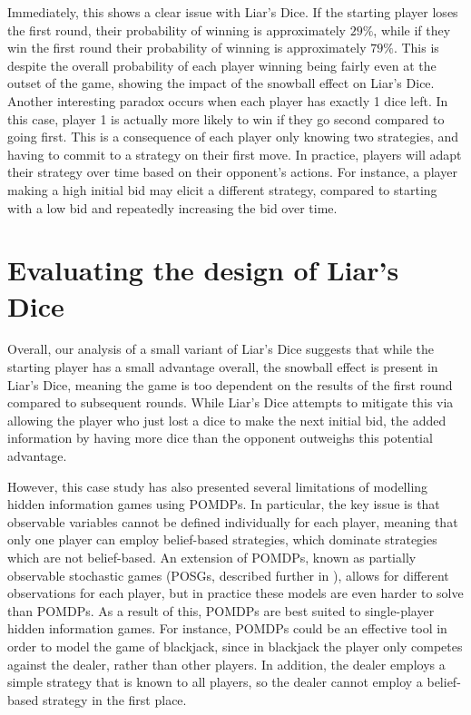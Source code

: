 Immediately, this shows a clear issue with Liar's Dice. If the starting player loses the first round, their probability of winning is approximately $29\%$, while if they win the first round their probability of winning is approximately $79\%$. This is despite the overall probability of each player winning being fairly even at the outset of the game, showing the impact of the snowball effect on Liar's Dice. Another interesting paradox occurs when each player has exactly 1 dice left. In this case, player 1 is actually more likely to win if they go second compared to going first. This is a consequence of each player only knowing two strategies, and having to commit to a strategy on their first move. In practice, players will adapt their strategy over time based on their opponent's actions. For instance, a player making a high initial bid may elicit a different strategy, compared to starting with a low bid and repeatedly increasing the bid over time.

\section{Evaluating the design of Liar's Dice}
\label{cs2:evaluation}

Overall, our analysis of a small variant of Liar's Dice suggests that while the starting player has a small advantage overall, the snowball effect is present in Liar's Dice, meaning the game is too dependent on the results of the first round compared to subsequent rounds. While Liar's Dice attempts to mitigate this via allowing the player who just lost a dice to make the next initial bid, the added information by having more dice than the opponent outweighs this potential advantage.

However, this case study has also presented several limitations of modelling hidden information games using POMDPs. In particular, the key issue is that observable variables cannot be defined individually for each player, meaning that only one player can employ belief-based strategies, which dominate strategies which are not belief-based. An extension of POMDPs, known as partially observable stochastic games (POSGs, described further in \cite{hansen_dynamic_nodate}), allows for different observations for each player, but in practice these models are even harder to solve than POMDPs. As a result of this, POMDPs are best suited to single-player hidden information games. For instance, POMDPs could be an effective tool in order to model the game of blackjack, since in blackjack the player only competes against the dealer, rather than other players. In addition, the dealer employs a simple strategy that is known to all players, so the dealer cannot employ a belief-based strategy in the first place.

